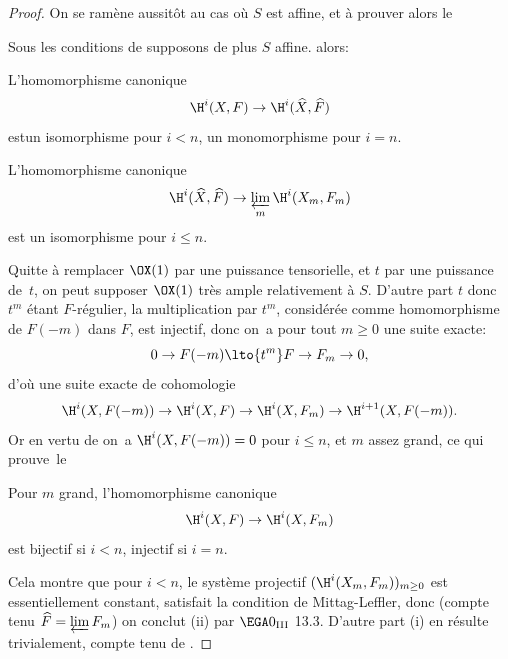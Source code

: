 \begin{proof}
On se ram\`ene aussit\^{o}t au cas o\`u $S$ est affine, et \`a prouver alors le

\begin{corollaire} \label{XII.2.2}
Sous les conditions de  supposons de plus $S$ affine. alors:
\begin{enumeratei}
\item
L'homomorphisme canonique
\[
\H^i(X, F) \to \H^i(\widehat{X}, \widehat{F})
\]
est\pageoriginale un isomorphisme pour $i<n$, un monomorphisme pour $i=n$.
\item
L'homomorphisme canonique
\[
\H^i(\widehat{X}, \widehat{F}) \to \varprojlim_m \H^i(X_m, F_m)
\]
est un isomorphisme pour $i\leq n$.
\end{enumeratei}
\end{corollaire}

Quitte \`a remplacer $\OX(1)$ par une puissance tensorielle, et $t$ par une puissance de~$t$, on peut supposer $\OX(1)$ tr\`es ample relativement \`a $S$. D'autre part $t$ donc $t^m$ \'etant $F$-r\'egulier, la multiplication par $t^m$, consid\'er\'ee comme homomorphisme de $F(-m)$ dans $F$, est injectif, donc on~a pour tout $m\geq 0$ une suite exacte:
\steco
\begin{equation} \label{eq:XII.14}
0\to F(-m) \lto{t^m} F \to F_m \to0,
\end{equation}
d'o\`u une suite exacte de cohomologie
\[
\H^i(X, F(-m)) \to \H^i(X, F) \to \H^i(X, F_m) \to \H^{i+1}(X, F(-m)).
\]
Or en vertu de  on~a $\H^i(X, F(-m))=0$ pour $i\leq n$, et $m$ assez grand, ce qui prouve~le

\begin{lemme} \label{XII.2.3}
Pour $m$ grand, l'homomorphisme canonique
\[
\H^i(X, F) \to \H^i(X, F_m)
\]
est bijectif si $i<n$, injectif si $i=n$.
\end{lemme}

\enlargethispage{-2\baselineskip}%
Cela montre que pour $i<n$, le syst\`eme projectif $(\H^i(X_m, F_m))_{m\geq 0}$ est essentiellement constant, \afortiori satisfait la condition de Mittag-Leffler, donc (compte tenu  $\widehat{F}= \varprojlim F_m$) on conclut (ii) par $\EGA 0_{\textup{III}}$ 13.3. D'autre part (i) en r\'esulte trivialement, compte tenu de .


\end{proof}
